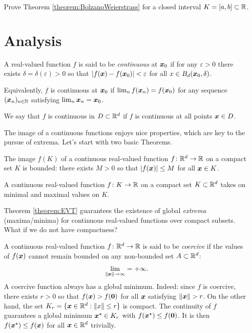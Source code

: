 \begin{problem}\label{problem:BolzanoWeierstrass}
Prove Theorem \ref{theorem:BolzanoWeierstrass} for a closed interval $K=[a,b] \subset \mathbb{R}$.
\end{problem}

\section{Analysis}

A real-valued function $f$ is said to be \emph{continuous} at $\boldsymbol{x}_0$ if for any $\varepsilon>0$ there exists $\delta = \delta(\varepsilon)>0$ so that $\lvert f(\boldsymbol{x}) - f(\boldsymbol{x}_0) \rvert < \varepsilon$ for all $x \in B_d(\boldsymbol{x}_0, \delta)$.

Equivalently, $f$ is continuous at $\boldsymbol{x}_0$ if $\lim_n f(\boldsymbol{x}_n) = f(\boldsymbol{x}_0)$ for any sequence $({\boldsymbol{x}}_{n})_{{n}\in\mathbb{N}}$ satisfying $\lim_n \boldsymbol{x}_n = \boldsymbol{x}_0$.  

We say that $f$ is continuous in $D \subset \mathbb{R}^d$ if $f$ is continuous at all points $\boldsymbol{x} \in D$.

The image of a continuous functions enjoys nice properties, which are key to the pursue of extrema.  Let's start with two basic Theorems.

\begin{theorem}\label{theorem:BVT}
The image $f(K)$ of a continuous real-valued function $f \colon \mathbb{R}^d \to \mathbb{R}$ on a compact set $K$ is bounded: there exists $M>0$ so that $\lvert  f(\boldsymbol{x})  \rvert \leq M$ for all $\boldsymbol{x} \in K$.
\end{theorem}

\begin{theorem}\label{theorem:EVT}
A continuous real-valued function $f \colon K \to \mathbb{R}$ on a compact set $K \subset \mathbb{R}^d$ takes on minimal and maximal values on $K$.
\end{theorem}

Theorem \ref{theorem:EVT} guarantees the existence of global \emph{extrema} (maxima/minima) for continuous real-valued functions over compact subsets.  What if we do not have compactness?

\begin{example}
A continuous real-valued function $f\colon \mathbb{R}^d \to \mathbb{R}$ is said to be \emph{coercive} if the values of $f(\boldsymbol{x})$ cannot remain bounded on any non-bounded set $A\subset \mathbb{R}^d$: 
\begin{equation*}
\lim_{\lVert \boldsymbol{x} \rVert \to \infty} = +\infty.
\end{equation*}
A coercive function always has a global minimum.  Indeed: since $f$ is coercive, there exists $r>0$ so that $f(\boldsymbol{x}) > f(\boldsymbol{0})$ for all $\boldsymbol{x}$ satisfying $\lVert \boldsymbol{x} \rVert>r$.  On the other hand, the set $K_r = \{ \boldsymbol{x} \in \mathbb{R}^d : \lVert x \rVert \leq r \}$ is compact.  The continuity of $f$ guarantees a global minimum $\boldsymbol{x}^{\star} \in K_r$ with $f(\boldsymbol{x}^{\star}) \leq f(\boldsymbol{0})$.  It is then $f(\boldsymbol{x}^{\star}) \leq f(\boldsymbol{x})$ for all $\boldsymbol{x} \in \mathbb{R}^d$ trivially.
\end{example}


